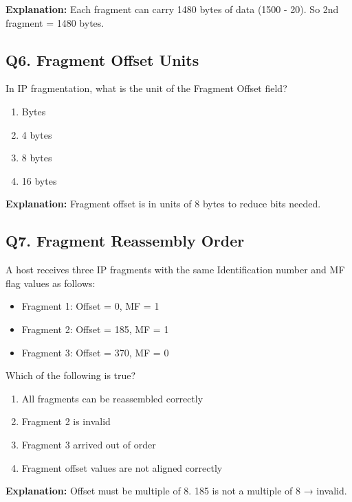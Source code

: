 \textbf{Explanation:} Each fragment can carry 1480 bytes of data (1500 - 20). So 2nd fragment = 1480 bytes.

\vspace{1em}

\subsection*{Q6. Fragment Offset Units}
In IP fragmentation, what is the unit of the Fragment Offset field?

\begin{enumerate}[label=(\alph*)]
    \item Bytes  
    \item 4 bytes  
    \item 8 bytes  
    \item 16 bytes  
\end{enumerate}

\textbf{Explanation:} Fragment offset is in units of 8 bytes to reduce bits needed.

\vspace{1em}

\subsection*{Q7. Fragment Reassembly Order}
A host receives three IP fragments with the same Identification number and MF flag values as follows:
\begin{itemize}
    \item Fragment 1: Offset = 0, MF = 1  
    \item Fragment 2: Offset = 185, MF = 1  
    \item Fragment 3: Offset = 370, MF = 0  
\end{itemize}
Which of the following is true?

\begin{enumerate}[label=(\alph*)]
    \item All fragments can be reassembled correctly  
    \item Fragment 2 is invalid  
    \item Fragment 3 arrived out of order  
    \item Fragment offset values are not aligned correctly  
\end{enumerate}

\textbf{Explanation:} Offset must be multiple of 8. 185 is not a multiple of 8 → invalid.

\vspace{1em}


